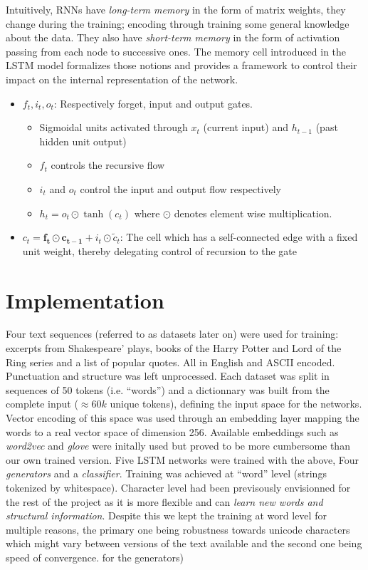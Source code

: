 \documentclass{article}
\begin{document}
Intuitively, RNNs have \textit{long-term memory} in the form of matrix weights,
they change during the training; encoding through training some general
knowledge about the data. They also have \textit{short-term memory} in the form
of activation passing from each node to successive ones. The memory cell
introduced in the LSTM model formalizes those notions and provides a framework
to control their impact on the internal representation of the network.
\begin{center}
    \begin{itemize}
    \item $f_t, i_t, o_t$: Respectively forget, input and output gates.
        \begin{itemize}
            \normalsize
            \item Sigmoidal units activated through  $x_t$ (current input) and
                $h_{t-1}$ (past hidden unit output) \item $f_t$ controls the
                recursive flow
            \item $i_t$ and $o_t$ control the input and output flow
                respectively
            \item $h_t = o_t \odot \tanh(c_t)$ where $\odot$ denotes element
                wise multiplication.
        \end{itemize}
    \item $c_t = \mathbf{f_t \odot c_{t-1}} + i_t \odot \tilde{c}_t$: The cell
    which has a self-connected edge with a fixed unit weight, thereby delegating
    control of recursion to the gate
    \end{itemize}
\end{center}
\section{Implementation}
Four text sequences (referred to as datasets later on) were used for training:
excerpts from Shakespeare' plays, books of the Harry Potter and Lord of the
Ring series and a list of popular quotes.  All in English and ASCII encoded.
Punctuation and structure was left unprocessed.  Each dataset was split in
sequences of 50 tokens (i.e.  ``words'') and a dictionnary was built from the
complete input ($\approx 60k$ unique tokens), defining the input space for the
networks.  Vector encoding of this space was used through an embedding layer
mapping the words to a real vector space of dimension 256.  Available
embeddings such as \textit{word2vec} and \textit{glove} were initally used but
proved to be more cumbersome than our own trained version.  Five LSTM networks
were trained with the above, Four \textit{generators} and a
\textit{classifier}. Training was achieved at ``word'' level (strings tokenized
by whitespace). Character level had been previsously envisionned for the rest
of the project as it is more flexible and can \textit{learn new words and
structural information}. Despite this we kept the training at word level for
multiple reasons, the primary one being robustness towards unicode characters
which might vary between versions of the text available and the second one
being speed of convergence. 
\cite{gravesGenerating} for the generators)
\end{document}
